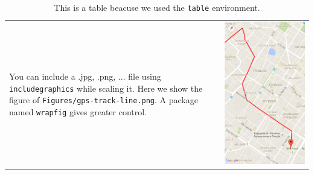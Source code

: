 \begin{table}[htb]
\begin{tabular}{lr}\hline
 \parbox{0.75\textwidth}
         {\TBD{} You can include a .jpg, .png, ...
  file using {\tt includegraphics} while scaling it.  Here we show
  the figure of {\tt Figures/gps-track-line.png}.
  A package named {\tt wrapfig} gives greater control.
}
&
\includegraphics[scale=0.08]{Figures/gps-track-line.png}
\end{tabular}
\caption{This is a table beacuse we used the {\tt table} environment.}
\label{fig:gps-track-line.png}
\end{table}

